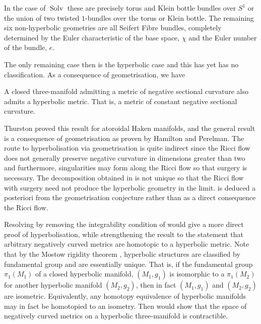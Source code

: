 \documentclass[a4paper,12pt]{amsart}
\begin{document}
In the case of \(\operatorname{Solv}\) these are precisely torus and Klein bottle bundles over \(S^1\) or the union of two twisted \(1\)-bundles over the torus or Klein bottle. The remaining six non-hyperbolic geometries are all Seifert Fibre bundles, completely determined by the Euler characteristic of the base space, \(\chi\) and the Euler number of the bundle, \(e\).

The only remaining case then is the hyperbolic case and this has yet has no classification. As a consequence of geometrisation, we have

\begin{thm}[Hyperbolisation]
\label{thm:hyperbolisation}

A closed three-manifold admitting a metric of negative sectional curvature also admits a hyperbolic metric. That is, a metric of constant negative sectional curvature.
\end{thm}

Thurston proved this result for atoroidal Haken manifolds, and the general result is a consequence of geometrisation as proven by Hamilton and Perelman. The route to hyperbolisation via geometrisation is quite indirect since the Ricci flow does not generally preserve negative curvature in dimensions greater than two and furthermore, singularities may form along the Ricci flow so that surgery is necessary. The decomposition obtained in  is not unique so that the Ricci flow with surgery need not produce the hyperbolic geometry in the limit.  is deduced a posteriori from the geometrisation conjecture rather than as a direct consequence the Ricci flow.

Resolving  by removing the integrability condition of  would give a more direct proof of hyperbolisation, while strengthening the result to the statement that arbitrary negatively curved metrics are homotopic to a hyperbolic metric. Note that by the Mostow rigidity theorem \cite{MR0236383}, hyperbolic structures are classified by fundamental group and are essentially unique. That is, if the fundamental group \(\pi_1(M_1)\) of a closed hyperbolic manifold, \((M_1, g_1)\) is isomorphic to a \(\pi_1(M_2)\) for another hyperbolic manifold \((M_2, g_2)\), then in fact \((M_1, g_1)\) and \((M_2, g_2)\) are isometric. Equivalently, any homotopy equivalence of hyperbolic manifolds may in fact be homotopied to an isometry. Then  would show that the space of negatively curved metrics on a hyperbolic three-manifold is contractible.
\end{document}
